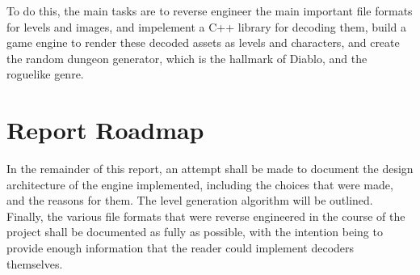 	To do this, the main tasks are to reverse engineer the main important file formats for levels and images, and impelement a C++ library for decoding them, build a game engine to render these decoded assets as levels and characters, and create the random dungeon generator, which is the hallmark of Diablo, and the roguelike genre.
	
	\section{Report Roadmap}
	In the remainder of this report, an attempt shall be made to document the design architecture of the engine  implemented, including the choices that were made, and the reasons for them. The level generation algorithm will be outlined. Finally, the various file formats that were reverse engineered in the course of the project shall be documented as fully as possible, with the intention being to provide enough information that the reader could implement decoders themselves.
